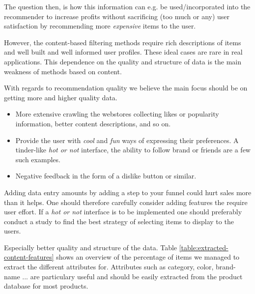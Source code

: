 The question then, is how this information can e.g. be used/incorporated into
the recommender to increase profits without sacrificing (too much or any) user
satisfaction by recommending more \emph{expensive} items to the user.


However, the content-based filtering methods require rich descriptions of items
and well built and well informed user profiles. These ideal cases are rare in
real applications. This dependence on the quality and structure of data is the
main weakness of methods based on content.

With regards to recommendation quality we believe the main focus should be on
getting more and higher quality data.

\begin{itemize}

\item More extensive crawling the webstores collecting likes or popularity
information, better content descriptions, and so on.

\item Provide the user with \emph{cool} and \emph{fun} ways of expressing their
preferences. A tinder-like \emph{hot or not} interface, the ability to follow
brand or friends are a few such examples.

\item Negative feedback in the form of a dislike button or similar.
\end{itemize}

Adding data entry amounts by adding a step to your funnel could hurt sales more
than it helps. One should therefore carefully consider adding features the
require user effort. If a \emph{hot or not} interface is to be implemented one
should preferably conduct a study to find the best strategy of selecting items
to display to the users.

Especially better quality and structure of the data. Table
\ref{table:extracted-content-features} shows an overview of the percentage of
items we managed to extract the different attributes for. Attributes such as
category, color, brand-name ...  are particulary useful and should be easily
extracted from the product database for most products.


